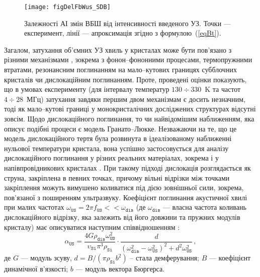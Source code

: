 \documentclass[a4paper,14pt,oneside,openany]{memoir}
\begin{document}
\begin{figure}
\center
\texttt{[image: figDelFbWus\_SDB]}
\caption{\label{figDelFbWus_SDB}
Залежності АІ змін ВБШ від інтенсивності введеного УЗ.
Точки --- експеримент,
лінії --- апроксимація згідно з формулою~(\ref{eqBt}).
}%
\end{figure}

Загалом, затухання об'ємних УЗ хвиль у кристалах може бути пов'язано з різними механізмами \cite{True},
зокрема з фонон--фононними процесами,
термопружними втратами, резонансним поглинанням на мало--кутових границях субблочних кристалів чи дислокаційним поглинанням.
Проте, проведені оцінки показують, що в умовах експерименту (для інтервалу температур $130\div330$~K та частот $4\div28$~МГц) затухання завдяки першим двом механізмам
є досить незначним, тоді як мало--кутові границі у монокристалічних досліджених структурах відсутні зовсім.
Щодо дислокаційного поглинання, то чи найвідомішим наближенням, яка описує подібні процеси є модель Гранато--Люкке.
Незважаючи на те, що це модель дислокаційного тертя була розвинута в ідеалізованому наближенні нульової температури кристала, вона успішно застосовується для аналізу
дислокаційного поглинання у різних реальних матеріалах, зокрема і у напівпровідникових кристалах \cite{OstrKorBook,Nik}.
При такому підході дислокація розглядається як струна, закріплена в певних точках, причому вільні відрізки між точками закріплення можуть вимушено коливатися під дією зовнішньої сили, зокрема, пов'язаної з поширенням ультразвуку.
 Коефіцієнт поглинання акустичної хвилі при малих частотах $\omega_\mathtt{US}=2\pi f_\mathtt{US}<<\omega_\mathtt{dis}$
(де $\omega_\mathtt{dis}$ --- власна частота коливань дислокаційного відрізку, яка залежить від його довжини та пружних модулів кристалу)
 має описуватися наступним співвідношенням \cite{Granato,True}:
\begin{equation}
\label{eqAlphsGL}
\alpha_\mathtt{US}=\frac{4G\rho_\mathtt{dis}\omega_\mathtt{US}^2}{\upsilon_\mathtt{Si}\pi^3\rho_\mathtt{Si}}\cdot
    \frac{d}{(\omega_\mathtt{dis}^2-\omega_\mathtt{US}^2)^2+d^2\omega_\mathtt{US}^2}\,,
\end{equation}
де $G$ --- модуль зсуву,
$d = B/(\pi\rho_\mathtt{Si} b^2)$ -- стала демферування;
$B$ --- коефіцієнт динамічної в'язкості;
$b$ --- модуль вектора Бюргерса.
\end{document}
